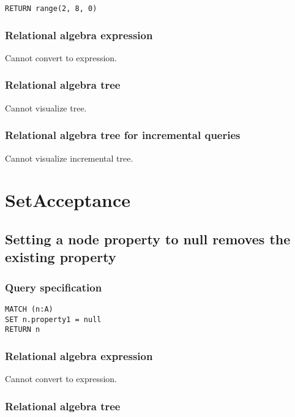 \begin{lstlisting}
RETURN range(2, 8, 0)
\end{lstlisting}

\subsubsection*{Relational algebra expression}

Cannot convert to expression.

\subsubsection*{Relational algebra tree}

Cannot visualize tree.

\subsubsection*{Relational algebra tree for incremental queries}

Cannot visualize incremental tree.

\section{SetAcceptance}

\subsection{Setting a node property to null removes the existing property}

\subsubsection*{Query specification}

\begin{lstlisting}
MATCH (n:A)
SET n.property1 = null
RETURN n
\end{lstlisting}

\subsubsection*{Relational algebra expression}

Cannot convert to expression.

\subsubsection*{Relational algebra tree}

